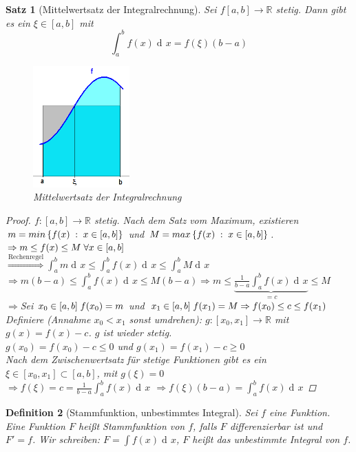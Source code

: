 \documentclass[a4paper,titlepage,oneside]{article}
\def\R{\ensuremath{\mathbb{R}} }
\newcommand{\der}{\operatorname{d\!}{}}
\newcommand{\dx}{\der x}
\def\sp{\hspace{0,1cm}}
\newcommand{\menge}[2]{\ensuremath{\left\{#1\sp : \sp #2\right\}}}
\newcommand{\integral}[4][x]{\ensuremath{\int_{#2}^{#3}{#4\der #1}}}
\newcommand{\intAB}[2][x]{\integral[#1]{a}{b}{#2}}
\theoremstyle{thmstyle}
\newtheorem{satz}{Satz}[section]
\newtheorem{defi}[satz]{Definition}
\theoremstyle{subthmstyle}
\begin{document}
\begin{satz}[Mittelwertsatz der Integralrechnung]
Sei $f [a,b] \to \R$ stetig. Dann gibt es ein $\xi \in [a,b]$ mit \[\intAB{f(x)} = f(\xi)(b-a)\]
\begin{figure}[ht]\centering
 \includegraphics[width=0.33\textwidth]{images/mws_integral.png}
\caption{Mittelwertsatz der Integralrechnung}
\end{figure}
\begin{proof}
$f: [a,b] \to \R$ stetig. Nach dem Satz vom Maximum, existieren $m = min\menge{f(x)}{x \in [a,b]}$ und $M = max\menge{f(x)}{x \in [a,b]}$.\\
$\Rightarrow m \le f(x) \le M \sp \forall x \in [a,b]$\\
$\displaystyle  \overset{\text{Rechenregel}}{\Rightarrow } \intAB{m} \le \intAB{f(x)} \le \intAB{M}$\\
$\displaystyle  \Rightarrow m(b-a) \le \intAB{f(x)} \le M(b-a) \Rightarrow m \le \underbrace{\frac{1}{b-a}\intAB{f(x)}}_{= c} \le M$\\
$\Rightarrow $Sei $ x_0 \in [a,b] \sp f(x_0) = m$ und $x_1 \in [a,b] \sp f(x_1) = M \Rightarrow f(x_0) \le c \le f(x_1)$\\
Definiere (Annahme $x_0 < x_1$ sonst umdrehen): $g: [x_0,x_1] \to \R$ mit $g(x) = f(x) - c$. $g$ ist wieder stetig.\\
$g(x_0) = f(x_0) -c  \le 0$ und $g(x_1) = f(x_1) - c \ge 0$\\
Nach dem Zwischenwertsatz für stetige Funktionen gibt es ein $\xi \in  [x_0,x_1] \subset [a,b]$, mit $g(\xi) = 0$\\
$\displaystyle \Rightarrow f(\xi) = c = \frac{1}{b-a}\intAB{f(x)}$
$\displaystyle \Rightarrow f(\xi)(b-a) = \intAB{f(x)}$
\end{proof}
\end{satz}

\begin{defi}[Stammfunktion, unbestimmtes Integral]
Sei $f$ eine Funktion. Eine Funktion $F$ heißt Stammfunktion von $f$, falls $F$ differenzierbar ist und $F' = f$.
Wir schreiben: $\displaystyle F = \int{f(x)\dx}$, 
$F$ heißt das unbestimmte Integral von $f$.
\end{defi}
\end{document}
